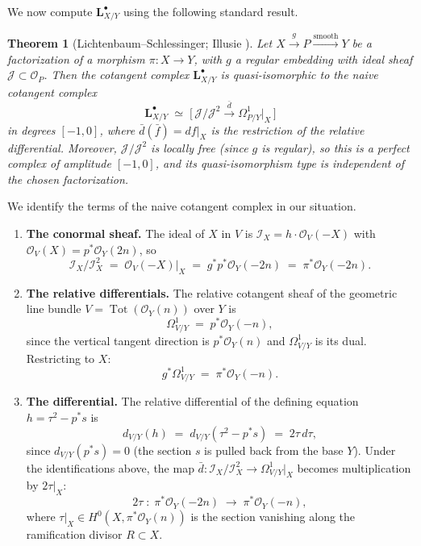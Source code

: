 \documentclass[11pt,twoside]{amsart}
\theoremstyle{plain}
\numberwithin{equation}{section}
\newtheorem{theorem}{Theorem}[section]
\newcommand{\OO}{\mathcal{O}}
\theoremstyle{definition}
\newcommand{\cI}{\mathscr{I}}
\DeclareMathOperator{\Tot}{Tot}
\newcommand{\LL}{\mathbf{L}}
\newcommand{\cJ}{\mathcal{J}}
\begin{document}
We now compute $\LL^\bullet_{X/Y}$ using the following standard result.
 
\begin{theorem}[Lichtenbaum--Schlessinger; Illusie {\cite[II.1.2.4.2, II.2.2.1]{Illusie}}]\label{thm:naive}
Let $X \xrightarrow{g} P \xrightarrow{\mathrm{smooth}} Y$ be a factorization of a morphism $\pi\colon X \to Y$, with $g$ a regular embedding with ideal sheaf $\cJ \subset \OO_P$. Then the cotangent complex $\LL^\bullet_{X/Y}$ is quasi-isomorphic to the naive cotangent complex
\[
\LL^\bullet_{X/Y} \;\simeq\; \Big[\,\cJ/\cJ^2 \xrightarrow{\;\bar{d}\;} \Omega^1_{P/Y}\big|_X\,\Big]
\]
in degrees $[-1, 0]$, where $\bar{d}(\bar{f}) = df\big|_X$ is the restriction of the relative differential. Moreover, $\cJ/\cJ^2$ is locally free (since $g$ is regular), so this is a perfect complex of amplitude $[-1,0]$, and its quasi-isomorphism type is independent of the chosen factorization.
\end{theorem}
 
We identify the terms of the naive cotangent complex in our situation.
 
\begin{enumerate}
\item \textbf{The conormal sheaf.} The ideal of $X$ in $V$ is $\cI_X = h \cdot \OO_V(-X)$ with $\OO_V(X) = p^*\OO_Y(2n)$, so
\[
\cI_X/\cI_X^2 \;=\; \OO_V(-X)\big|_X \;=\; g^*p^*\OO_Y(-2n) \;=\; \pi^*\OO_Y(-2n).
\]
 
\item \textbf{The relative differentials.} The relative cotangent sheaf of the geometric line bundle $V = \Tot(\OO_Y(n))$ over $Y$ is
\[
\Omega^1_{V/Y} \;=\; p^*\OO_Y(-n),
\]
since the vertical tangent direction is $p^*\OO_Y(n)$ and $\Omega^1_{V/Y}$ is its dual. Restricting to $X$:
\[
g^*\Omega^1_{V/Y} \;=\; \pi^*\OO_Y(-n).
\]
 
\item \textbf{The differential.} The relative differential of the defining equation $h = \tau^2 - p^*s$ is
\[
d_{V/Y}(h) \;=\; d_{V/Y}(\tau^2 - p^*s) \;=\; 2\tau\, d\tau,
\]
since $d_{V/Y}(p^*s) = 0$ (the section $s$ is pulled back from the base $Y$). Under the identifications above, the map $\bar{d}\colon \cI_X/\cI_X^2 \to \Omega^1_{V/Y}\big|_X$ becomes multiplication by $2\tau\big|_X$:
\[
2\tau \;\colon\; \pi^*\OO_Y(-2n) \;\longrightarrow\; \pi^*\OO_Y(-n),
\]
where $\tau\big|_X \in H^0(X, \pi^*\OO_Y(n))$ is the section vanishing along the ramification divisor $R \subset X$.
\end{enumerate}
 
\end{document}
